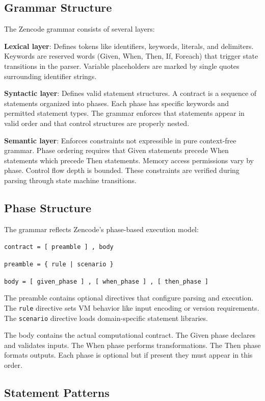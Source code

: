 \subsection{Grammar Structure}

The Zencode grammar consists of several layers:

\textbf{Lexical layer}: Defines tokens like identifiers, keywords,
literals, and delimiters. Keywords are reserved words (Given, When,
Then, If, Foreach) that trigger state transitions in the
parser. Variable placeholders are marked by single quotes surrounding
identifier strings.

\textbf{Syntactic layer}: Defines valid statement structures. A
contract is a sequence of statements organized into phases. Each phase
has specific keywords and permitted statement types. The grammar
enforces that statements appear in valid order and that control
structures are properly nested.

\textbf{Semantic layer}: Enforces constraints not expressible in pure
context-free grammar. Phase ordering requires that Given statements
precede When statements which precede Then statements. Memory access
permissions vary by phase. Control flow depth is bounded. These
constraints are verified during parsing through state machine
transitions.

\subsection{Phase Structure}

The grammar reflects Zencode's phase-based execution model:

\texttt{contract = [ preamble ] , body}

\texttt{preamble = \{ rule | scenario \}}

\texttt{body = [ given\_phase ] , [ when\_phase ] , [ then\_phase ]}

The preamble contains optional directives that configure parsing and
execution. The \texttt{rule} directive sets VM behavior like input
encoding or version requirements. The \texttt{scenario} directive
loads domain-specific statement libraries.

The body contains the actual computational contract. The Given phase
declares and validates inputs. The When phase performs
transformations. The Then phase formats outputs. Each phase is
optional but if present they must appear in this order.

\subsection{Statement Patterns}

